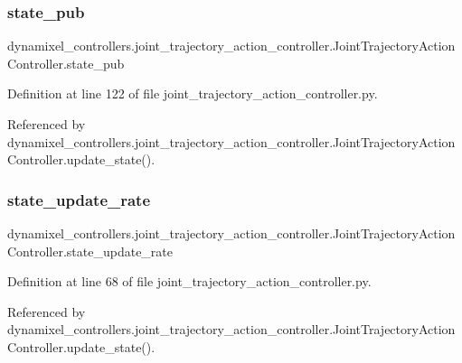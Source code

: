 \subsubsection{\texorpdfstring{state\+\_\+pub}{state\_pub}}
{\footnotesize\ttfamily dynamixel\+\_\+controllers.\+joint\+\_\+trajectory\+\_\+action\+\_\+controller.\+Joint\+Trajectory\+Action\+Controller.\+state\+\_\+pub}



Definition at line 122 of file joint\+\_\+trajectory\+\_\+action\+\_\+controller.\+py.



Referenced by dynamixel\+\_\+controllers.\+joint\+\_\+trajectory\+\_\+action\+\_\+controller.\+Joint\+Trajectory\+Action\+Controller.\+update\+\_\+state().

\mbox{\label{classdynamixel__controllers_1_1joint__trajectory__action__controller_1_1_joint_trajectory_action_controller_a236a96d17f00a2db7f1acaae9922a0df}} 
\subsubsection{\texorpdfstring{state\+\_\+update\+\_\+rate}{state\_update\_rate}}
{\footnotesize\ttfamily dynamixel\+\_\+controllers.\+joint\+\_\+trajectory\+\_\+action\+\_\+controller.\+Joint\+Trajectory\+Action\+Controller.\+state\+\_\+update\+\_\+rate}



Definition at line 68 of file joint\+\_\+trajectory\+\_\+action\+\_\+controller.\+py.



Referenced by dynamixel\+\_\+controllers.\+joint\+\_\+trajectory\+\_\+action\+\_\+controller.\+Joint\+Trajectory\+Action\+Controller.\+update\+\_\+state().

